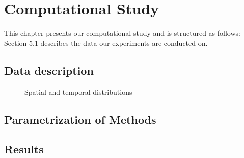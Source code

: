 \chapter{Computational Study}

This chapter presents our computational study and is structured as follows: Section 5.1 describes the data our experiments are conducted on.  
\section{Data description}

\begin{figure}[h]
	\centering
	\caption{Spatial and temporal distributions}
	\label{fig:spatial_dist}
\end{figure}

\section{Parametrization of Methods}

\section{Results}







